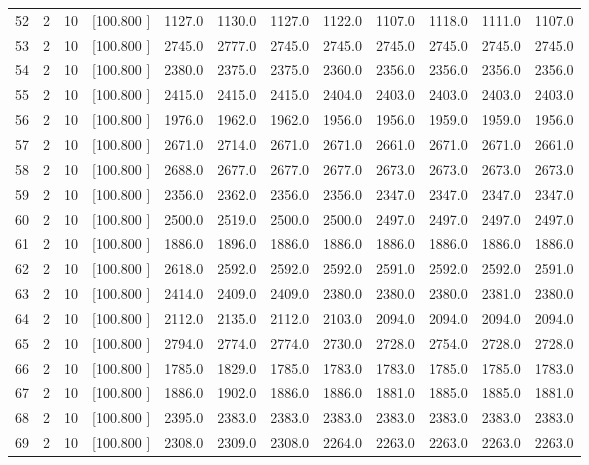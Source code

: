 \documentclass[12pt,a4paper]{article}
\begin{document}
\begin{center}
{\begin{tabular}{r r r r r r r r r r r r}
  52&  2& 10&[100.800   ]&  1127.0&  1130.0&  1127.0&  1122.0&  1107.0&  1118.0&  1111.0&  1107.0\\[-0.02in]
  53&  2& 10&[100.800   ]&  2745.0&  2777.0&  2745.0&  2745.0&  2745.0&  2745.0&  2745.0&  2745.0\\[-0.02in]
  54&  2& 10&[100.800   ]&  2380.0&  2375.0&  2375.0&  2360.0&  2356.0&  2356.0&  2356.0&  2356.0\\[-0.02in]
  55&  2& 10&[100.800   ]&  2415.0&  2415.0&  2415.0&  2404.0&  2403.0&  2403.0&  2403.0&  2403.0\\[-0.02in]
  56&  2& 10&[100.800   ]&  1976.0&  1962.0&  1962.0&  1956.0&  1956.0&  1959.0&  1959.0&  1956.0\\[-0.02in]
  57&  2& 10&[100.800   ]&  2671.0&  2714.0&  2671.0&  2671.0&  2661.0&  2671.0&  2671.0&  2661.0\\[-0.02in]
  58&  2& 10&[100.800   ]&  2688.0&  2677.0&  2677.0&  2677.0&  2673.0&  2673.0&  2673.0&  2673.0\\[-0.02in]
  59&  2& 10&[100.800   ]&  2356.0&  2362.0&  2356.0&  2356.0&  2347.0&  2347.0&  2347.0&  2347.0\\[-0.02in]
  60&  2& 10&[100.800   ]&  2500.0&  2519.0&  2500.0&  2500.0&  2497.0&  2497.0&  2497.0&  2497.0\\[-0.02in]
  61&  2& 10&[100.800   ]&  1886.0&  1896.0&  1886.0&  1886.0&  1886.0&  1886.0&  1886.0&  1886.0\\[-0.02in]
  62&  2& 10&[100.800   ]&  2618.0&  2592.0&  2592.0&  2592.0&  2591.0&  2592.0&  2592.0&  2591.0\\[-0.02in]
  63&  2& 10&[100.800   ]&  2414.0&  2409.0&  2409.0&  2380.0&  2380.0&  2380.0&  2381.0&  2380.0\\[-0.02in]
  64&  2& 10&[100.800   ]&  2112.0&  2135.0&  2112.0&  2103.0&  2094.0&  2094.0&  2094.0&  2094.0\\[-0.02in]
  65&  2& 10&[100.800   ]&  2794.0&  2774.0&  2774.0&  2730.0&  2728.0&  2754.0&  2728.0&  2728.0\\[-0.02in]
  66&  2& 10&[100.800   ]&  1785.0&  1829.0&  1785.0&  1783.0&  1783.0&  1785.0&  1785.0&  1783.0\\[-0.02in]
  67&  2& 10&[100.800   ]&  1886.0&  1902.0&  1886.0&  1886.0&  1881.0&  1885.0&  1885.0&  1881.0\\[-0.02in]
  68&  2& 10&[100.800   ]&  2395.0&  2383.0&  2383.0&  2383.0&  2383.0&  2383.0&  2383.0&  2383.0\\[-0.02in]
  69&  2& 10&[100.800   ]&  2308.0&  2309.0&  2308.0&  2264.0&  2263.0&  2263.0&  2263.0&  2263.0\\[-0.02in]

\end{tabular}}
\end{center}
\end{document}
